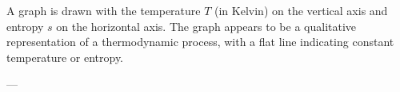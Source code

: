 A graph is drawn with the temperature \( T \) (in Kelvin) on the vertical axis and entropy \( s \) on the horizontal axis. The graph appears to be a qualitative representation of a thermodynamic process, with a flat line indicating constant temperature or entropy.

---